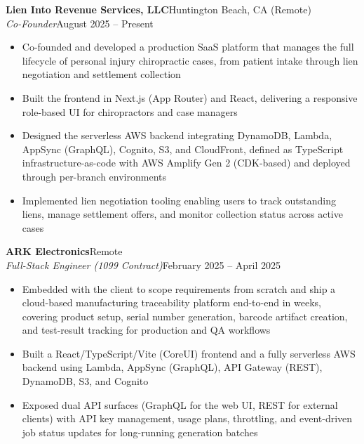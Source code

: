 \documentclass[10.5pt, letterpaper]{article}
\newcommand{\jobentry}[4]{%
  \noindent
  \textbf{\color{accent}#1}\hfill\textcolor{muted}{\small #2}\\
  \textit{#3}\hfill\textcolor{muted}{\small #4}%
}
\begin{document}
\jobentry{Lien Into Revenue Services, LLC}{Huntington Beach, CA (Remote)}{Co-Founder}{August 2025 -- Present}
\begin{itemize}
  \item Co-founded and developed a production SaaS platform that manages the full
        lifecycle of personal injury chiropractic cases, from patient intake through
        lien negotiation and settlement collection
  \item Built the frontend in Next.js (App Router) and React, delivering a responsive
        role-based UI for chiropractors and case managers
  \item Designed the serverless AWS backend integrating DynamoDB, Lambda, AppSync
        (GraphQL), Cognito, S3, and CloudFront, defined as TypeScript
        infrastructure-as-code with AWS Amplify Gen 2 (CDK-based) and deployed
        through per-branch environments
  \item Implemented lien negotiation tooling enabling users to track outstanding liens,
        manage settlement offers, and monitor collection status across active cases
\end{itemize}

\vspace{5pt}

\jobentry{ARK Electronics}{Remote}{Full-Stack Engineer \normalfont\small(1099 Contract)}{February 2025 -- April 2025}
\begin{itemize}
  \item Embedded with the client to scope requirements from scratch and ship a
        cloud-based manufacturing traceability platform end-to-end in weeks, covering
        product setup, serial number generation, barcode artifact creation, and
        test-result tracking for production and QA workflows
  \item Built a React/TypeScript/Vite (CoreUI) frontend and a fully serverless AWS
        backend using Lambda, AppSync (GraphQL), API Gateway (REST), DynamoDB,
        S3, and Cognito
  \item Exposed dual API surfaces (GraphQL for the web UI, REST for external clients)
        with API key management, usage plans, throttling, and event-driven job status
        updates for long-running generation batches
\end{itemize}

\vspace{5pt}
\end{document}
